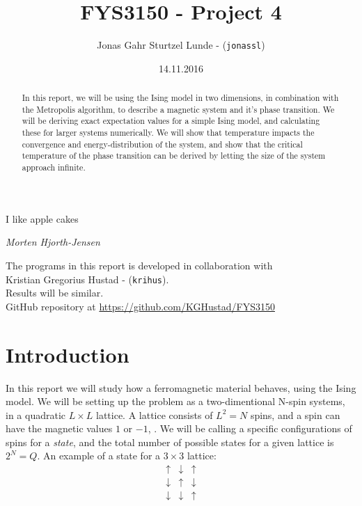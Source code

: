 \documentclass[10pt,a4paper]{article}
\begin{document}
\title{FYS3150 - Project 4}
\author{
	\begin{tabular}{rl}
		Jonas Gahr Sturtzel Lunde - (\texttt{jonassl})\\
	\end{tabular}}
\date{14.11.2016}
\maketitle



\setlength{\epigraphwidth}{0.75\textwidth}
\renewcommand{\epigraphflush}{center}
\renewcommand{\beforeepigraphskip}{50pt}
\renewcommand{\afterepigraphskip}{100pt}
\renewcommand{\epigraphsize}{\normalsize}
\epigraph{I like apple cakes}
	{\textit{Morten Hjorth-Jensen}}



\begin{abstract}
\noindent
In this report, we will be using the Ising model in two dimensions, in combination with the Metropolis algorithm, to describe a magnetic system and it's phase transition. We will be deriving exact expectation values for a simple Ising model, and calculating these for larger systems numerically. We will show that temperature impacts the convergence and energy-distribution of the system, and show that the critical temperature of the phase transition can be derived by letting the size of the system approach infinite.
\end{abstract}


\vfill
\begin{center}
The programs in this report is developed in collaboration with\\
Kristian Gregorius Hustad - (\texttt{krihus}).\\
Results will be similar.\\
\vspace{2mm}
GitHub repository at \url{https://github.com/KGHustad/FYS3150}
\end{center}
\pagebreak





\section{Introduction}
In this report we will study how a ferromagnetic material behaves, using the Ising model. We will be setting up the problem as a two-dimentional N-spin systems, in a quadratic $L\times L$ lattice. A lattice consists of $L^2 = N$ spins, and a spin can have the magnetic values $1$ or $-1$, . We will be calling a specific configurations of spins for a \textit{state}, and the total number of possible states for a given lattice is $2^N = Q$. An example of a state for a $3\times 3$ lattice:
\[
\begin{matrix}
\uparrow & \downarrow & \uparrow \\
\downarrow & \uparrow & \downarrow\\
\downarrow & \downarrow & \uparrow
\end{matrix}
\]
\end{document}

